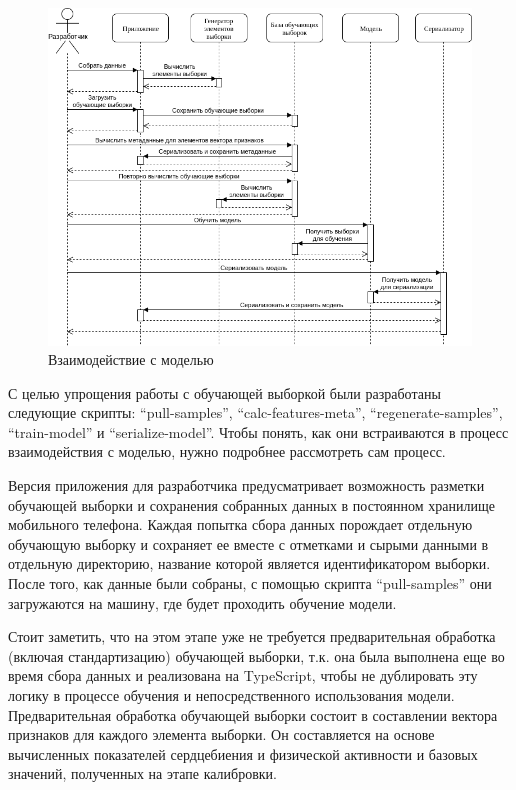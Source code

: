 \documentclass[14pt]{matmex-diploma-custom}
\begin{document}
\begin{figure}[ht]
  \centering \includegraphics[width=\textwidth]{images/model_interaction.png}
  \caption{Взаимодействие с моделью}
  \label{fig:model_interaction}
\end{figure}

С целью упрощения работы с обучающей выборкой были разработаны следующие
скрипты: ``pull-samples'', ``calc-features-meta'', ``regenerate-samples'',
``train-model'' и ``serialize-model''. Чтобы понять, как они встраиваются в
процесс взаимодействия с моделью, нужно подробнее рассмотреть сам процесс.

Версия приложения для разработчика предусматривает возможность разметки
обучающей выборки и сохранения собранных данных в постоянном хранилище
мобильного телефона. Каждая попытка сбора данных порождает отдельную обучающую
выборку и сохраняет ее вместе с отметками и сырыми данными в отдельную
директорию, название которой является идентификатором выборки. После того, как
данные были собраны, с помощью скрипта ``pull-samples'' они загружаются на
машину, где будет проходить обучение модели.

Стоит заметить, что на этом этапе уже не требуется предварительная обработка
(включая стандартизацию) обучающей выборки, т.к. она была выполнена еще во время
сбора данных и реализована на TypeScript, чтобы не дублировать эту логику в
процессе обучения и непосредственного использования модели. Предварительная
обработка обучающей выборки состоит в составлении вектора признаков для каждого
элемента выборки. Он составляется на основе вычисленных показателей сердцебиения
и физической активности и базовых значений, полученных на этапе калибровки.
\end{document}
